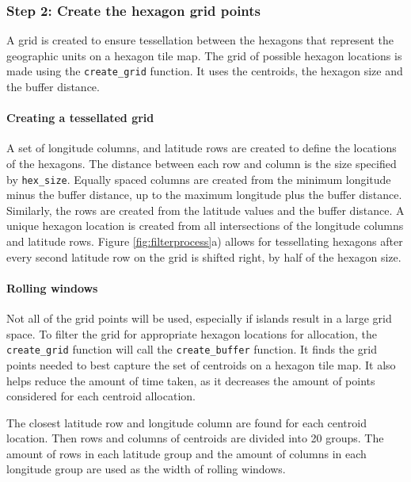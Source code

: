 \hypertarget{step-2-create-the-hexagon-grid-points}{%
\subsubsection{Step 2: Create the hexagon grid
points}\label{step-2-create-the-hexagon-grid-points}}

A grid is created to ensure tessellation between the hexagons that
represent the geographic units on a hexagon tile map. The grid of
possible hexagon locations is made using the \texttt{create\_grid}
function. It uses the centroids, the hexagon size and the buffer
distance.

\hypertarget{creating-a-tessellated-grid}{%
\paragraph{Creating a tessellated
grid}\label{creating-a-tessellated-grid}}

A set of longitude columns, and latitude rows are created to define the
locations of the hexagons. The distance between each row and column is
the size specified by \texttt{hex\_size}. Equally spaced columns are
created from the minimum longitude minus the buffer distance, up to the
maximum longitude plus the buffer distance. Similarly, the rows are
created from the latitude values and the buffer distance. A unique
hexagon location is created from all intersections of the longitude
columns and latitude rows. Figure \ref{fig:filterprocess}a) allows for
tessellating hexagons after every second latitude row on the grid is
shifted right, by half of the hexagon size.

\hypertarget{rolling-windows}{%
\paragraph{Rolling windows}\label{rolling-windows}}

Not all of the grid points will be used, especially if islands result in
a large grid space. To filter the grid for appropriate hexagon locations
for allocation, the \texttt{create\_grid} function will call the
\texttt{create\_buffer} function. It finds the grid points needed to
best capture the set of centroids on a hexagon tile map. It also helps
reduce the amount of time taken, as it decreases the amount of points
considered for each centroid allocation.

The closest latitude row and longitude column are found for each
centroid location. Then rows and columns of centroids are divided into
20 groups. The amount of rows in each latitude group and the amount of
columns in each longitude group are used as the width of rolling
windows.


